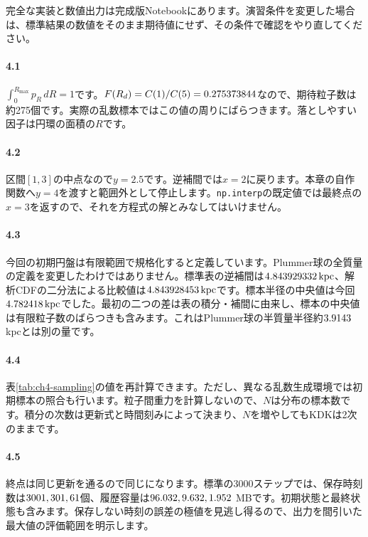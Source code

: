 \bigskip
完全な実装と数値出力は完成版Notebookにあります。演習条件を変更した場合は、標準結果の数値をそのまま期待値にせず、その条件で確認をやり直してください。



\paragraph{4.1}
$\int_0^{R_{\max}}p_R\,dR=1$です。$F(R_d)=C(1)/C(5)=0.275373844$なので、期待粒子数は約275個です。実際の乱数標本ではこの値の周りにばらつきます。落としやすい因子は円環の面積の$R$です。

\paragraph{4.2}
区間$[1,3]$の中点なので$y=2.5$です。逆補間では$x=2$に戻ります。本章の自作関数へ$y=4$を渡すと範囲外として停止します。\texttt{np.interp}の既定値では最終点の$x=3$を返すので、それを方程式の解とみなしてはいけません。

\paragraph{4.3}
今回の初期円盤は有限範囲で規格化すると定義しています。Plummer球の全質量の定義を変更したわけではありません。標準表の逆補間は$4.843929332\,\mathrm{kpc}$、解析CDFの二分法による比較値は$4.843928453\,\mathrm{kpc}$です。標本半径の中央値は今回$4.782418\,\mathrm{kpc}$でした。最初の二つの差は表の積分・補間に由来し、標本の中央値は有限粒子数のばらつきも含みます。これはPlummer球の半質量半径約$3.9143$ kpcとは別の量です。

\paragraph{4.4}
表\ref{tab:ch4-sampling}の値を再計算できます。ただし、異なる乱数生成環境では初期標本の照合も行います。粒子間重力を計算しないので、$N$は分布の標本数です。積分の次数は更新式と時間刻みによって決まり、$N$を増やしてもKDKは2次のままです。

\paragraph{4.5}
終点は同じ更新を通るので同じになります。標準の3000ステップでは、保存時刻数は$3001,301,61$個、履歴容量は$96.032,9.632,1.952$ MBです。初期状態と最終状態も含みます。保存しない時刻の誤差の極値を見逃し得るので、出力を間引いた最大値の評価範囲を明示します。

